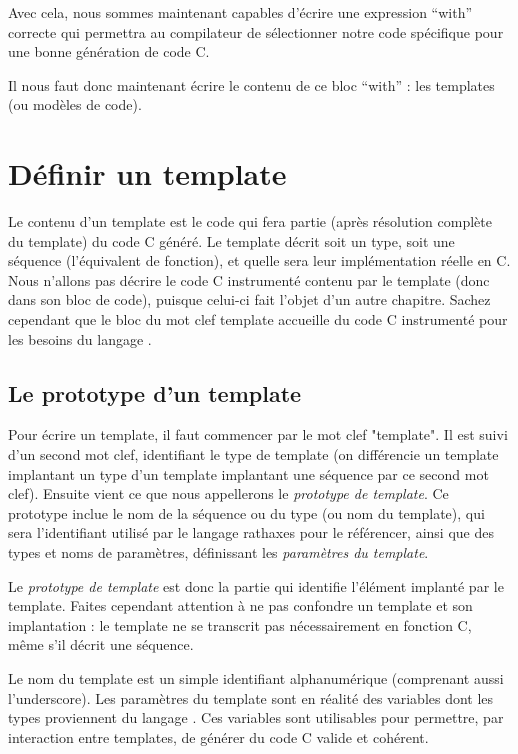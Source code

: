 \documentclass[french]{rtxreport}
\begin{document}
Avec cela, nous sommes maintenant capables d'écrire une expression “with”
correcte qui permettra au compilateur de sélectionner notre code spécifique
pour une bonne génération de code C.

Il nous faut donc maintenant écrire le contenu de ce bloc “with” :
les templates (ou modèles de code).


\chapter{Définir un template}

Le contenu d'un template est le code qui fera partie (après résolution complète
du template) du code C généré. Le template décrit soit un type, soit une
séquence (l'équivalent \rtx de fonction), et quelle sera leur implémentation
réelle en C. Nous n'allons pas décrire le code C instrumenté contenu par le
template (donc dans son bloc de code), puisque celui-ci fait l'objet d'un autre
chapitre. Sachez cependant que le bloc du mot clef template accueille du code
C instrumenté pour les besoins du langage \rtx.


\section{Le prototype d'un template}

Pour écrire un template, il faut commencer par le mot clef "template". Il est
suivi d'un second mot clef, identifiant le type de template (on différencie un
template implantant un type d'un template implantant une séquence par ce second
mot clef). Ensuite vient ce que nous appellerons le \emph{prototype de
template}. Ce prototype inclue le nom de la séquence ou du type (ou nom du
template), qui sera l'identifiant utilisé par le langage rathaxes pour le
référencer, ainsi que des types et noms de paramètres, définissant les
\emph{paramètres du template}.

Le \emph{prototype de template} est donc la partie qui identifie l'élément
implanté par le template. Faites cependant attention à ne pas confondre un
template et son implantation : le template ne se transcrit pas nécessairement
en fonction C, même s'il décrit une séquence.

Le nom du template est un simple identifiant alphanumérique (comprenant aussi
l'underscore). Les paramètres du template sont en réalité des variables dont
les types proviennent du langage \rtx . Ces variables sont utilisables pour
permettre, par interaction entre templates, de générer du code C valide et
cohérent.
\end{document}
